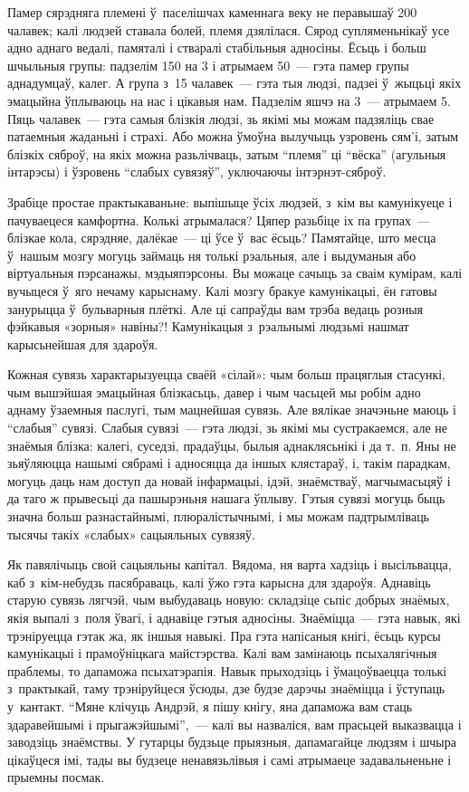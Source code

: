 Памер сярэдняга племені ў~паселішчах каменнага веку не перавышаў 200 чалавек; калі людзей ставала болей, племя дзялілася. Сярод супляменьнікаў усе адно аднаго ведалі, памяталі і стваралі стабільныя адносіны. Ёсьць і больш шчыльныя групы: падзелім 150 на 3 і атрымаем 50~--- гэта памер групы аднадумцаў, калег. А група з~15 чалавек~--- гэта тыя людзі, падзеі ў~жыцьці якіх эмацыйна ўплываюць на нас і цікавыя нам. Падзелім яшчэ на 3~--- атрымаем 5. Пяць чалавек~--- гэта самыя блізкія людзі, зь якімі мы можам падзяліць свае патаемныя жаданьні і страхі. Або можна ўмоўна вылучыць узровень сям'і, затым блізкіх сяброў, на якіх можна разьлічваць, затым ``племя'' ці ``вёска'' (агульныя інтарэсы) і ўзровень ``слабых сувязяў'', уключаючы інтэрнэт-сяброў.

Зрабіце простае практыкаваньне: выпішыце ўсіх людзей, з~кім вы камунікуеце і пачуваецеся камфортна. Колькі атрымалася? Цяпер разьбіце іх па групах~--- блізкае кола, сярэдняе, далёкае~--- ці ўсе ў~вас ёсьць? Памятайце, што месца ў~нашым мозгу могуць займаць ня толькі рэальныя, але і выдуманыя або віртуальныя пэрсанажы, мэдыяпэрсоны. Вы можаце сачыць за сваім кумірам, калі вучыцеся ў~яго нечаму карыснаму. Калі мозгу бракуе камунікацыі, ён гатовы занурыцца ў~бульварныя плёткі. Але ці сапраўды вам трэба ведаць розныя фэйкавыя «зорныя» навіны?! Камунікацыя з~рэальнымі людзьмі нашмат карысьнейшая для здароўя.

Кожная сувязь характарызуецца сваёй «сілай»: чым больш працяглыя стасункі, чым вышэйшая эмацыйная блізкасьць, давер і чым часьцей мы робім адно аднаму ўзаемныя паслугі, тым мацнейшая сувязь. Але вялікае значэньне маюць і ``слабыя'' сувязі. Слабыя сувязі~--- гэта людзі, зь якімі мы сустракаемся, але не знаёмыя блізка: калегі, суседзі, прадаўцы, былыя аднаклясьнікі і да т.~п. Яны не зьяўляюцца нашымі сябрамі і адносяцца да іншых клястараў, і, такім парадкам, могуць даць нам доступ да новай інфармацыі, ідэй, знаёмстваў, магчымасьцяў і да таго ж прывесьці да пашырэньня нашага ўплыву. Гэтыя сувязі могуць быць значна больш разнастайнымі, плюралістычнымі, і мы можам падтрымліваць тысячы такіх «слабых» сацыяльных сувязяў.

Як павялічыць свой сацыяльны капітал. Вядома, ня варта хадзіць і высільвацца, каб з~кім-небудзь пасябраваць, калі ўжо гэта карысна для здароўя. Аднавіць старую сувязь лягчэй, чым выбудаваць новую: складзіце сьпіс добрых знаёмых, якія выпалі з~поля ўвагі, і аднавіце гэтыя адносіны. Знаёміцца~--- гэта навык, які трэніруецца гэтак жа, як іншыя навыкі. Пра гэта напісаныя кнігі, ёсьць курсы камунікацыі і прамоўніцкага майстэрства. Калі вам замінаюць псыхалягічныя праблемы, то дапаможа псыхатэрапія. Навык прыходзіць і ўмацоўваецца толькі з~практыкай, таму трэніруйцеся ўсюды, дзе будзе дарэчы знаёміцца і ўступаць у~кантакт. ``Мяне клічуць Андрэй, я пішу кнігу, яна дапаможа вам стаць здаравейшымі і прыгажэйшымі'',~--- калі вы назваліся, вам прасьцей выказвацца і заводзіць знаёмствы. У гутарцы будзьце прыязныя, дапамагайце людзям і шчыра цікаўцеся імі, тады вы будзеце ненавязьлівыя і самі атрымаеце задавальненьне і прыемны посмак.

